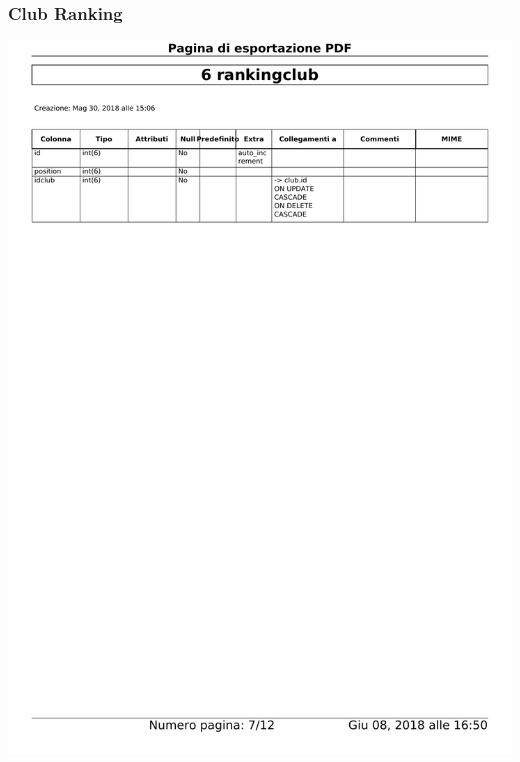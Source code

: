 \documentclass{article}
\begin{document}
    \subsubsection{Club Ranking}
    \begin{center}
        \includegraphics[width=15cm]{images/rankingclub}
    \end{center}
\end{document}
